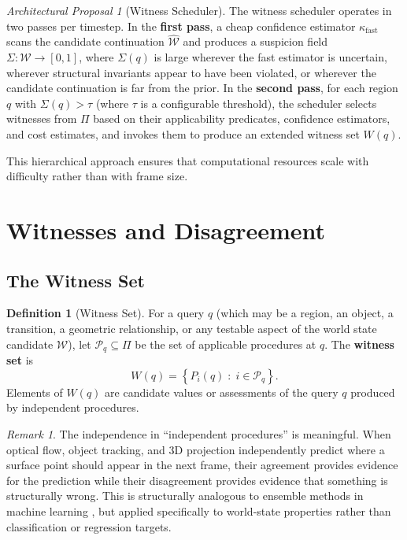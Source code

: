 \documentclass[11pt,a4paper]{article}
\theoremstyle{plain}
\theoremstyle{definition}
\newtheorem{definition}[theorem]{Definition}
\theoremstyle{remark}
\newtheorem{remark}[theorem]{Remark}
\newtheorem{proposal}[theorem]{Architectural Proposal}
\begin{document}
\begin{proposal}[Witness Scheduler]
The witness scheduler operates in two passes per timestep. In the \textbf{first pass}, a cheap confidence estimator $\kappa_{\text{fast}}$ scans the candidate continuation $\hat{\mathcal{W}}$ and produces a suspicion field $\Sigma : \mathcal{W} \to [0,1]$, where $\Sigma(q)$ is large wherever the fast estimator is uncertain, wherever structural invariants appear to have been violated, or wherever the candidate continuation is far from the prior. In the \textbf{second pass}, for each region $q$ with $\Sigma(q) > \tau$ (where $\tau$ is a configurable threshold), the scheduler selects witnesses from $\Pi$ based on their applicability predicates, confidence estimators, and cost estimates, and invokes them to produce an extended witness set $W(q)$.
\end{proposal}

This hierarchical approach ensures that computational resources scale with difficulty rather than with frame size.

\section{Witnesses and Disagreement}
\label{sec:witnesses}

\subsection{The Witness Set}

\begin{definition}[Witness Set]
For a query $q$ (which may be a region, an object, a transition, a geometric relationship, or any testable aspect of the world state candidate $\hat{\mathcal{W}}$), let $\mathcal{P}_q \subseteq \Pi$ be the set of applicable procedures at $q$. The \textbf{witness set} is
\[
W(q) = \left\{ P_i(q) \;:\; i \in \mathcal{P}_q \right\}.
\]
Elements of $W(q)$ are candidate values or assessments of the query $q$ produced by independent procedures.
\end{definition}

\begin{remark}
The independence in ``independent procedures'' is meaningful. When optical flow, object tracking, and 3D projection independently predict where a surface point should appear in the next frame, their agreement provides evidence for the prediction while their disagreement provides evidence that something is structurally wrong. This is structurally analogous to ensemble methods in machine learning \cite{lakshminarayanan2017deep}, but applied specifically to world-state properties rather than classification or regression targets.
\end{remark}
\end{document}
